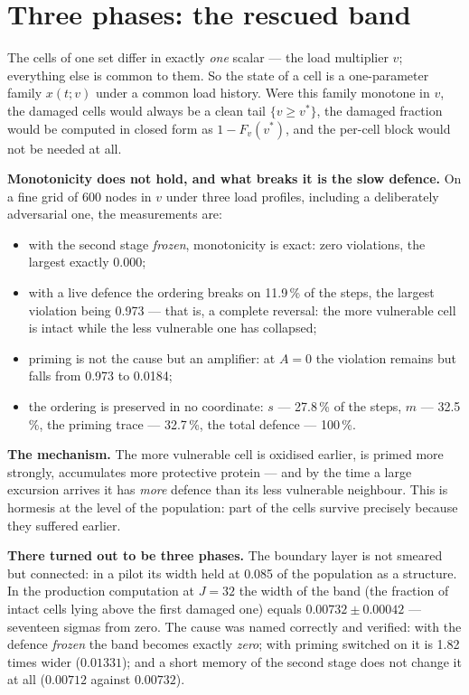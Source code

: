 \section{Three phases: the rescued band}\label{sec:band}
The cells of one set differ in exactly \emph{one} scalar --- the load multiplier $v$; everything else is common to them. So the state of a cell is a one-parameter family $x(t;v)$ under a common load history. Were this family monotone in $v$, the damaged cells would always be a clean tail $\{v\ge v^*\}$, the damaged fraction would be computed in closed form as $1-F_v(v^*)$, and the per-cell block would not be needed at all.

\textbf{Monotonicity does not hold, and what breaks it is the slow defence.} On a fine grid of 600 nodes in $v$ under three load profiles, including a deliberately adversarial one, the measurements are:
\begin{itemize}[leftmargin=1.1em,itemsep=1pt,topsep=2pt]
\item with the second stage \emph{frozen}, monotonicity is exact: zero violations, the largest exactly $0.000$;
\item with a live defence the ordering breaks on 11.9\,\% of the steps, the largest violation being 0.973 --- that is, a complete reversal: the more vulnerable cell is intact while the less vulnerable one has collapsed;
\item priming is not the cause but an amplifier: at $A=0$ the violation remains but falls from 0.973 to 0.0184;
\item the ordering is preserved in no coordinate: $s$ --- 27.8\,\% of the steps, $m$ --- 32.5\,\%, the priming trace --- 32.7\,\%, the total defence --- 100\,\%.
\end{itemize}

\textbf{The mechanism.} The more vulnerable cell is oxidised earlier, is primed more strongly, accumulates more protective protein --- and by the time a large excursion arrives it has \emph{more} defence than its less vulnerable neighbour. This is hormesis at the level of the population: part of the cells survive precisely because they suffered earlier.

\textbf{There turned out to be three phases.} The boundary layer is not smeared but connected: in a pilot its width held at 0.085 of the population as a structure. In the production computation at $J=32$ the width of the band (the fraction of intact cells lying above the first damaged one) equals $0.00732\pm0.00042$ --- seventeen sigmas from zero. The cause was named correctly and verified: with the defence \emph{frozen} the band becomes exactly \emph{zero}; with priming switched on it is 1.82 times wider ($0.01331$); and a short memory of the second stage does not change it at all ($0.00712$ against $0.00732$).

